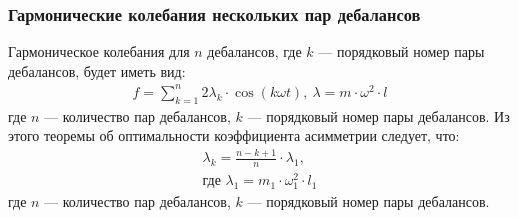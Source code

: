 \documentclass[10pt, pdf, hyperref={unicode}]{beamer}
\begin{document}
    \begin{frame}
        \frametitle{Гармонические колебания нескольких пар дебалансов}
        \begin{center}
            \begin{minipage}[h]{0.97\linewidth}
                Гармоническое колебания для $n$ дебалансов, где $k$ --- порядковый номер пары дебалансов, будет иметь вид:
                \begin{equation}\label{eq:short_harmonic_sum}
                    \begin{gathered}
                        f = \sum\limits_{k = 1}^n 2 \lambda_k \cdot \cos (k \omega t), \ \lambda = m \cdot \omega^2 \cdot l
                    \end{gathered}
                \end{equation}
                \noindent где $n$ --- количество пар дебалансов, $k$ --- порядковый номер пары дебалансов.
                Из этого теоремы об оптимальности коэффициента асимметрии следует, что:
                \begin{equation}\label{eq:opt_attitude}
                    \begin{gathered}
                        \lambda_k = \frac{n - k + 1}{n} \cdot \lambda_1,\\
                        \textrm{где } \lambda_1 = m_1 \cdot \omega_{1}^{2} \cdot l_1
                    \end{gathered}
                \end{equation}
                \noindent где $n$ --- количество пар дебалансов, $k$ --- порядковый номер пары дебалансов.
            \end{minipage}
        \end{center}
    \end{frame}
\end{document}
